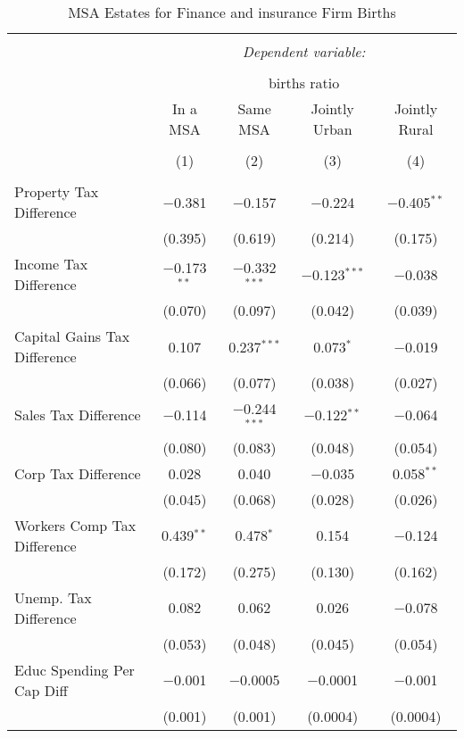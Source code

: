 
\begin{table}[!htbp] \centering 
  \caption{MSA Estates for  Finance and insurance Firm Births} 
  \label{52metro} 
\begin{tabular}{@{\extracolsep{5pt}}lcccc} 
\\[-1.8ex]\hline 
\hline \\[-1.8ex] 
 & \multicolumn{4}{c}{\textit{Dependent variable:}} \\ 
\cline{2-5} 
\\[-1.8ex] & \multicolumn{4}{c}{births ratio} \\ 
 & In a MSA & Same MSA & Jointly Urban & Jointly Rural \\ 
\\[-1.8ex] & (1) & (2) & (3) & (4)\\ 
\hline \\[-1.8ex] 
 Property Tax Difference & $-$0.381 & $-$0.157 & $-$0.224 & $-$0.405$^{**}$ \\ 
  & (0.395) & (0.619) & (0.214) & (0.175) \\ 
  Income Tax Difference & $-$0.173$^{**}$ & $-$0.332$^{***}$ & $-$0.123$^{***}$ & $-$0.038 \\ 
  & (0.070) & (0.097) & (0.042) & (0.039) \\ 
  Capital Gains Tax Difference & 0.107 & 0.237$^{***}$ & 0.073$^{*}$ & $-$0.019 \\ 
  & (0.066) & (0.077) & (0.038) & (0.027) \\ 
  Sales Tax Difference & $-$0.114 & $-$0.244$^{***}$ & $-$0.122$^{**}$ & $-$0.064 \\ 
  & (0.080) & (0.083) & (0.048) & (0.054) \\ 
  Corp Tax Difference & 0.028 & 0.040 & $-$0.035 & 0.058$^{**}$ \\ 
  & (0.045) & (0.068) & (0.028) & (0.026) \\ 
  Workers Comp Tax Difference & 0.439$^{**}$ & 0.478$^{*}$ & 0.154 & $-$0.124 \\ 
  & (0.172) & (0.275) & (0.130) & (0.162) \\ 
  Unemp. Tax Difference & 0.082 & 0.062 & 0.026 & $-$0.078 \\ 
  & (0.053) & (0.048) & (0.045) & (0.054) \\ 
  Educ Spending Per Cap Diff & $-$0.001 & $-$0.0005 & $-$0.0001 & $-$0.001 \\ 
  & (0.001) & (0.001) & (0.0004) & (0.0004) \\ 

\end{tabular}
\end{table}
